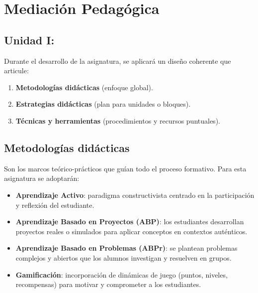 \section{Mediación Pedagógica}

\subsection*{Unidad I: \lipsum[1][1]} %

Durante el desarrollo de la asignatura, se aplicará un diseño coherente que articule:
\begin{enumerate}[leftmargin=*, itemsep=0.6em]
    \item \textbf{Metodologías didácticas} (enfoque global).
    \item \textbf{Estrategias didácticas} (plan para unidades o bloques).
    \item \textbf{Técnicas y herramientas} (procedimientos y recursos puntuales).
\end{enumerate}



\subsection*{Metodologías didácticas}
Son los marcos teórico-prácticos que guían todo el proceso formativo. Para esta asignatura se adoptarán:
\begin{itemize}[leftmargin=*, itemsep=0.6em]
    \item \textbf{Aprendizaje Activo}: paradigma constructivista centrado en la participación y reflexión del estudiante.
    \item \textbf{Aprendizaje Basado en Proyectos (ABP)}: los estudiantes desarrollan proyectos reales o simulados para aplicar conceptos en contextos auténticos.
    \item \textbf{Aprendizaje Basado en Problemas (ABPr)}: se plantean problemas complejos y abiertos que los alumnos investigan y resuelven en grupos.
    \item \textbf{Gamificación}: incorporación de dinámicas de juego (puntos, niveles, recompensas) para motivar y comprometer a los estudiantes.
\end{itemize}


